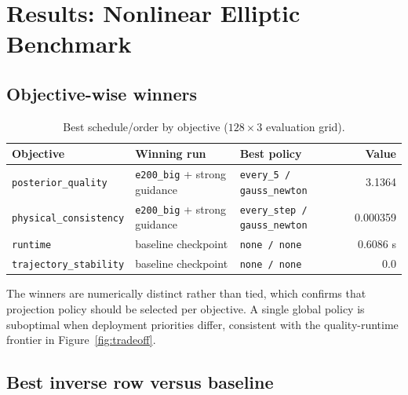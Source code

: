 \documentclass[10pt,twocolumn]{article}
\begin{document}
\section{Results: Nonlinear Elliptic Benchmark}
\subsection{Objective-wise winners}
\begin{table}[t]
\centering
\normalsize
\renewcommand{\arraystretch}{1.14}
\caption{Best schedule/order by objective (\(128\times3\) evaluation grid).}
\label{tab:obj_winners}
\begin{tabularx}{0.98\textwidth}{@{}lXl r@{}}
\toprule
\textbf{Objective} & \textbf{Winning run} & \textbf{Best policy} & \textbf{Value} \\
\midrule
\texttt{posterior\_quality} & \texttt{e200\_big} + strong guidance & \texttt{every\_5 / gauss\_newton} & 3.1364 \\
\texttt{physical\_consistency} & \texttt{e200\_big} + strong guidance & \texttt{every\_step / gauss\_newton} & 0.000359 \\
\texttt{runtime} & baseline checkpoint & \texttt{none / none} & 0.6086 s \\
\texttt{trajectory\_stability} & baseline checkpoint & \texttt{none / none} & 0.0 \\
\bottomrule
\end{tabularx}
\end{table}

The winners are numerically distinct rather than tied, which confirms that projection policy should be selected per objective. A single global policy is suboptimal when deployment priorities differ, consistent with the quality-runtime frontier in Figure~\ref{fig:tradeoff}.

\subsection{Best inverse row versus baseline}
\begin{table}[t]
\centering
\normalsize
\caption{Best inverse row comparison (\(128\times3\)).}
\end{table}
\end{document}
